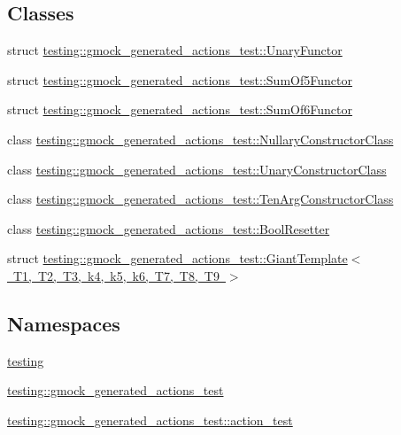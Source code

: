 \subsection*{Classes}
\begin{DoxyCompactItemize}
\item 
struct \mbox{\hyperlink{structtesting_1_1gmock__generated__actions__test_1_1_unary_functor}{testing\+::gmock\+\_\+generated\+\_\+actions\+\_\+test\+::\+Unary\+Functor}}
\item 
struct \mbox{\hyperlink{structtesting_1_1gmock__generated__actions__test_1_1_sum_of5_functor}{testing\+::gmock\+\_\+generated\+\_\+actions\+\_\+test\+::\+Sum\+Of5\+Functor}}
\item 
struct \mbox{\hyperlink{structtesting_1_1gmock__generated__actions__test_1_1_sum_of6_functor}{testing\+::gmock\+\_\+generated\+\_\+actions\+\_\+test\+::\+Sum\+Of6\+Functor}}
\item 
class \mbox{\hyperlink{classtesting_1_1gmock__generated__actions__test_1_1_nullary_constructor_class}{testing\+::gmock\+\_\+generated\+\_\+actions\+\_\+test\+::\+Nullary\+Constructor\+Class}}
\item 
class \mbox{\hyperlink{classtesting_1_1gmock__generated__actions__test_1_1_unary_constructor_class}{testing\+::gmock\+\_\+generated\+\_\+actions\+\_\+test\+::\+Unary\+Constructor\+Class}}
\item 
class \mbox{\hyperlink{classtesting_1_1gmock__generated__actions__test_1_1_ten_arg_constructor_class}{testing\+::gmock\+\_\+generated\+\_\+actions\+\_\+test\+::\+Ten\+Arg\+Constructor\+Class}}
\item 
class \mbox{\hyperlink{classtesting_1_1gmock__generated__actions__test_1_1_bool_resetter}{testing\+::gmock\+\_\+generated\+\_\+actions\+\_\+test\+::\+Bool\+Resetter}}
\item 
struct \mbox{\hyperlink{structtesting_1_1gmock__generated__actions__test_1_1_giant_template}{testing\+::gmock\+\_\+generated\+\_\+actions\+\_\+test\+::\+Giant\+Template$<$ T1, T2, T3, k4, k5, k6, T7, T8, T9 $>$}}
\end{DoxyCompactItemize}
\subsection*{Namespaces}
\begin{DoxyCompactItemize}
\item 
 \mbox{\hyperlink{namespacetesting}{testing}}
\item 
 \mbox{\hyperlink{namespacetesting_1_1gmock__generated__actions__test}{testing\+::gmock\+\_\+generated\+\_\+actions\+\_\+test}}
\item 
 \mbox{\hyperlink{namespacetesting_1_1gmock__generated__actions__test_1_1action__test}{testing\+::gmock\+\_\+generated\+\_\+actions\+\_\+test\+::action\+\_\+test}}
\end{DoxyCompactItemize}
